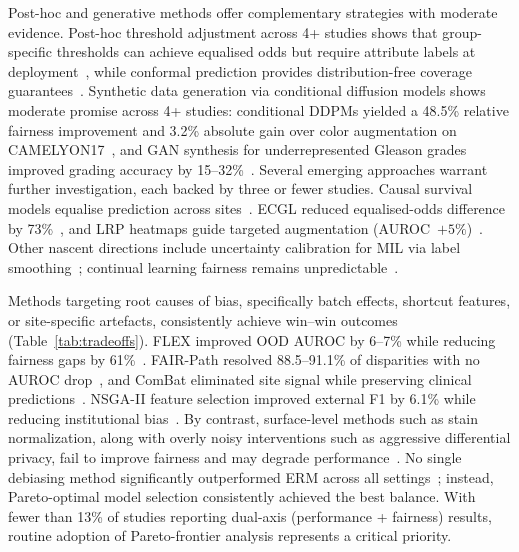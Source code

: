 Post-hoc and generative methods offer complementary strategies with moderate evidence. Post-hoc threshold adjustment across 4+ studies shows that group-specific
thresholds can achieve equalised odds but require attribute labels at
deployment~\citep{soltan2024challenges, sufian2024mitigating}, while
conformal prediction provides distribution-free coverage
guarantees~\citep{bhattacharyya2025conformal}. Synthetic data generation via conditional diffusion models shows moderate promise across 4+ studies:
conditional DDPMs yielded a 48.5\% relative fairness improvement and
3.2\% absolute gain over color augmentation on
CAMELYON17~\citep{ktena2024generative}, and GAN synthesis for
underrepresented Gleason grades improved grading accuracy by
15--32\%~\citep{vanbooven2025mitigating}. Several emerging approaches warrant further investigation, each backed by three or fewer studies. Causal survival models
equalise prediction across
sites~\citep{correamedero2024causal}. ECGL reduced equalised-odds
difference by 73\%~\citep{shabazian2025joint}, and LRP heatmaps guide
targeted augmentation (AUROC~$+5\%$)~\citep{hagele2020resolving}. Other nascent directions include
uncertainty calibration for MIL via label
smoothing~\citep{park2025uncertainty}; continual learning fairness
remains unpredictable~\citep{cecconi2024fairness}.

\label{sec:results:tradeoffs}%
Methods targeting root causes of bias, specifically batch effects, shortcut features, or site-specific artefacts, consistently achieve win--win outcomes (Table~\ref{tab:tradeoffs}). FLEX improved OOD AUROC by
6--7\% while reducing fairness gaps by
61\%~\citep{huang2025knowledge}. FAIR-Path resolved 88.5--91.1\% of
disparities with no AUROC drop~\citep{lin2025contrastive}, and ComBat
eliminated site signal while preserving clinical
predictions~\citep{murchan2024combat}. NSGA-II feature selection
improved external F1 by 6.1\% while reducing institutional
bias~\citep{bidgoli2022bias}. By contrast, surface-level methods such as stain
normalization, along with overly noisy interventions such as aggressive
differential privacy, fail to improve fairness and may degrade
performance~\citep{voon2023evaluating, lu2022federated}. No single debiasing method significantly outperformed
ERM across all settings~\citep{zong2023medfair}; instead, Pareto-optimal model
selection consistently achieved the best balance. With fewer than
13\% of studies reporting dual-axis (performance + fairness) results,
routine adoption of Pareto-frontier analysis represents a critical priority.

